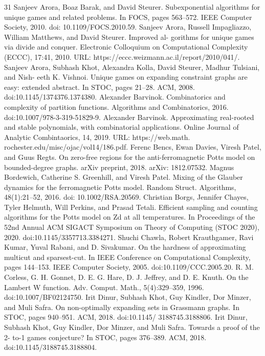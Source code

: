 \begin{thebibliography}{31}
Sanjeev Arora, Boaz Barak, and David Steurer. Subexponential algorithms for unique games and related problems. In FOCS, pages 563–572. IEEE Computer Society, 2010. doi: 10.1109/FOCS.2010.59.
Sanjeev Arora, Russell Impagliazzo, William Matthews, and David Steurer. Improved al- gorithms for unique games via divide and conquer. Electronic Colloquium on Computational Complexity (ECCC), 17:41, 2010. URL: https://eccc.weizmann.ac.il/report/2010/041/.
Sanjeev Arora, Subhash Khot, Alexandra Kolla, David Steurer, Madhur Tulsiani, and Nish- eeth K. Vishnoi. Unique games on expanding constraint graphs are easy: extended abstract. In STOC, pages 21–28. ACM, 2008. doi:10.1145/1374376.1374380.
Alexander Barvinok. Combinatorics and complexity of partition functions. Algorithms and Combinatorics, 2016. doi:10.1007/978-3-319-51829-9.
Alexander Barvinok. Approximating real-rooted and stable polynomials, with combinatorial applications. Online Journal of Analytic Combintaorics, 14, 2019. URL: https://web.math. rochester.edu/misc/ojac/vol14/186.pdf.
Ferenc Bencs, Ewan Davies, Viresh Patel, and Guus Regts. On zero-free regions for the anti-ferromagnetic Potts model on bounded-degree graphs. arXiv preprint, 2018. arXiv: 1812.07532.
Magnus Bordewich, Catherine S. Greenhill, and Viresh Patel. Mixing of the Glauber dynamics for the ferromagnetic Potts model. Random Struct. Algorithms, 48(1):21–52, 2016. doi: 10.1002/RSA.20569.
Christian Borgs, Jennifer Chayes, Tyler Helmuth, Will Perkins, and Prasad Tetali. Efficient sampling and counting algorithms for the Potts model on Zd at all temperatures. In Proceedings of the 52nd Annual ACM SIGACT Symposium on Theory of Computing (STOC 2020), 2020. doi:10.1145/3357713.3384271.
Shuchi Chawla, Robert Krauthgamer, Ravi Kumar, Yuval Rabani, and D. Sivakumar. On the hardness of approximating multicut and sparsest-cut. In IEEE Conference on Computational Complexity, pages 144–153. IEEE Computer Society, 2005. doi:10.1109/CCC.2005.20.
R. M. Corless, G. H. Gonnet, D. E. G. Hare, D. J. Jeffrey, and D. E. Knuth. On the Lambert W function. Adv. Comput. Math., 5(4):329–359, 1996. doi:10.1007/BF02124750.
Irit Dinur, Subhash Khot, Guy Kindler, Dor Minzer, and Muli Safra. On non-optimally expanding sets in Grassmann graphs. In STOC, pages 940–951. ACM, 2018. doi:10.1145/ 3188745.3188806.
Irit Dinur, Subhash Khot, Guy Kindler, Dor Minzer, and Muli Safra. Towards a proof of the 2- to-1 games conjecture? In STOC, pages 376–389. ACM, 2018. doi:10.1145/3188745.3188804.

\end{thebibliography}
